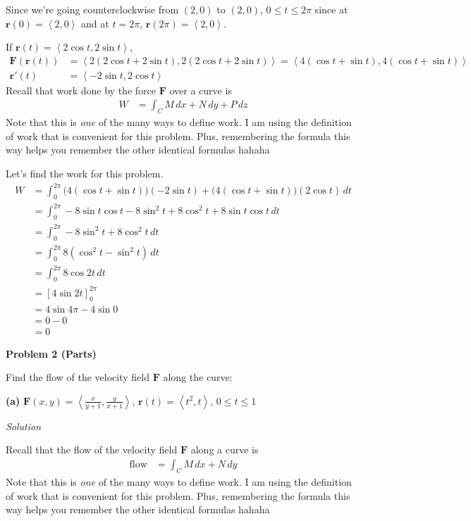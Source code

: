 \documentclass{article}
\newcommand{\lrp}[1]{\left( #1 \right)}
\newcommand{\lra}[1]{\left\langle #1 \right\rangle}
\newcommand{\lrb}[1]{\left[ #1 \right]}
\renewcommand{\r}[0]{\mathbf{r}}
\newcommand{\F}[0]{\mathbf{F}}
\newcommand{\Solution}{\textit{Solution}}
\begin{document}
Since we're going counterclockwise from $(2,0)$ to $(2,0)$, $0\leq t\leq 2\pi$ since at $\r(0)=\lra{2,0}$ and at $t=2\pi$, $\r\lrp{2\pi}=\lra{2,0}$.

If $\r(t)=\lra{2\cos t, 2\sin t}$,
\begin{align*}
    \F\lrp{\r(t)}&=\lra{2(2\cos t + 2\sin t),2(2\cos t + 2\sin t)}=\lra{4(\cos t + \sin t), 4(\cos t + \sin t)}\\
   \r'(t)&=\lra{-2\sin t, 2\cos t}
\end{align*}
Recall that work done by the force $\F$ over a curve is
\begin{align*}
    W&=\int_C M\,dx + N\,dy + P\,dz
\end{align*}
Note that this is \textit{one} of the many ways to define work. I am using the definition of work that is convenient for this problem. Plus, remembering the formula this way helps you remember the other identical formulas hahaha

Let's find the work for this problem.
\begin{align*}
    W&=\int_0^{2\pi} \big(4(\cos t + \sin t)\big)\lrp{-2\sin t}+\big(4(\cos t + \sin t)\big)\lrp{2\cos t}\,dt\\
    &=\int_0^{2\pi}-8\sin t\cos t - 8\sin^2 t + 8 \cos^2 t + 8\sin t \cos t\,dt\\
    &=\int_0^{2\pi} -8\sin^2 t + 8\cos^2 t\,dt\\
    &=\int_0^{2\pi} 8(\cos^2 t - \sin^2 t)\,dt\\
    &=\int_0^{2\pi}8\cos 2t\,dt\tag{$\cos^2 t - \sin^2 t=\cos 2t$}\\
    &=\lrb{4\sin 2t}_0^{2\pi}\\
    &=4\sin 4\pi - 4\sin 0\\
    &=0 - 0\\
    &=\boxed{0}
\end{align*}

{}\textbf{Problem 2 (Parts)} 

Find the flow of the velocity field $\F$ along the curve:

{}\textbf{(a)} $\displaystyle\F(x,y)=\lra{\frac{x}{y+1},\frac{y}{x+1}}$, $\r(t)=\lra{t^2,t}$, $0\leq t \leq 1$

\Solution

Recall that the flow of the velocity field $\F$ along a curve is
\begin{align*}
    \text{flow}&=\int_C M\,dx + N\,dy
\end{align*}
Note that this is \textit{one} of the many ways to define work. I am using the definition of work that is convenient for this problem. Plus, remembering the formula this way helps you remember the other identical formulas hahaha
\end{document}

